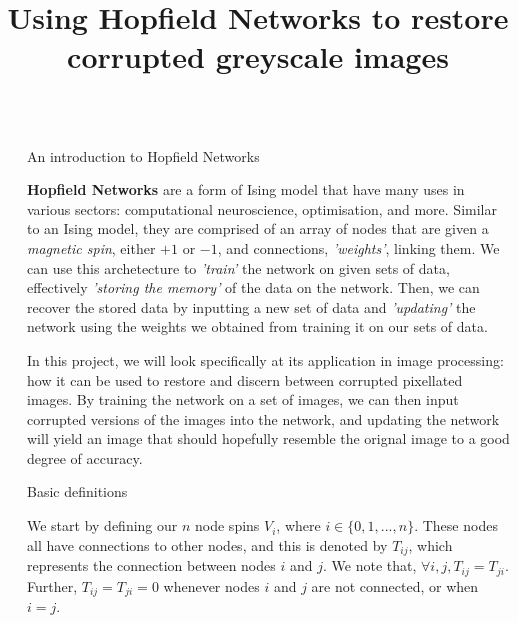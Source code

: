 \documentclass[final]{beamer}
\title{Using Hopfield Networks to restore corrupted greyscale images}
\newlength{\sepwidth}
\newlength{\colwidth}
\newcommand{\separatorcolumn}{\begin{column}{\sepwidth}\end{column}}
\begin{document}
\begin{frame}[t]
\begin{columns}[t]
\separatorcolumn

\begin{column}{\colwidth}

  \begin{block}{An introduction to Hopfield Networks}

    \textbf{Hopfield Networks} are a form of Ising model that have many uses in various sectors: 
    computational neuroscience, optimisation, and more. Similar to an Ising model, they
    are comprised of an array of nodes that are given a \textit{magnetic spin},
    either $+1$ or $-1$, and connections, \textit{'weights'}, linking them.
    We can use this archetecture to \textit{'train'} the network on given sets of data,
    effectively \textit{'storing the memory'} of the data on the network.
    Then, we can recover the stored data by inputting a new set of data
    and \textit{'updating'} the network using the weights we obtained from training
    it on our sets of data.


    In this project, we will look specifically at its application in image processing: how it can
    be used to restore and discern between corrupted pixellated images. By training the network on
    a set of images, we can then input corrupted versions of the images into the network, and updating
    the network will yield an image that should hopefully resemble the orignal image to a good degree
    of accuracy.

  \end{block}

  \begin{block}{Basic definitions}

    We start by defining our $n$ node spins $V_i$, where $i \in \{0, 1, ..., n\}$.
    These nodes all have connections to other nodes, and this is denoted by
    $T_{ij}$, which represents the connection between nodes $i$ and $j$. We note that,
    $\forall i, j, T_{ij} = T_{ji}$. Further, $T_{ij} = T_{ji} = 0$ whenever
    nodes $i$ and $j$ are not connected, or when $i = j$.


\end{block}
\end{column}
\end{columns}
\end{frame}
\end{document}
